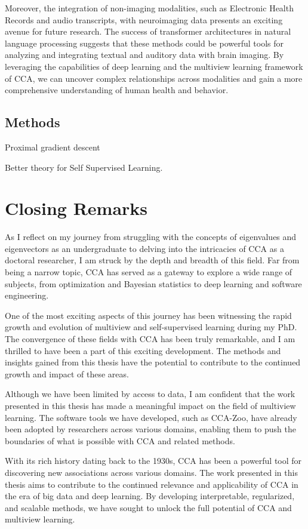Moreover, the integration of non-imaging modalities, such as Electronic Health Records and audio transcripts, with neuroimaging data presents an exciting avenue for future research. The success of transformer architectures in natural language processing suggests that these methods could be powerful tools for analyzing and integrating textual and auditory data with brain imaging. By leveraging the capabilities of deep learning and the multiview learning framework of CCA, we can uncover complex relationships across modalities and gain a more comprehensive understanding of human health and behavior.

\subsection{Methods}

Proximal gradient descent

Better theory for Self Supervised Learning.

\section{Closing Remarks}

As I reflect on my journey from struggling with the concepts of eigenvalues and eigenvectors as an undergraduate to delving into the intricacies of CCA as a doctoral researcher, I am struck by the depth and breadth of this field. Far from being a narrow topic, CCA has served as a gateway to explore a wide range of subjects, from optimization and Bayesian statistics to deep learning and software engineering.

One of the most exciting aspects of this journey has been witnessing the rapid growth and evolution of multiview and self-supervised learning during my PhD. The convergence of these fields with CCA has been truly remarkable, and I am thrilled to have been a part of this exciting development. The methods and insights gained from this thesis have the potential to contribute to the continued growth and impact of these areas.

Although we have been limited by access to data, I am confident that the work presented in this thesis has made a meaningful impact on the field of multiview learning. The software tools we have developed, such as CCA-Zoo, have already been adopted by researchers across various domains, enabling them to push the boundaries of what is possible with CCA and related methods.

With its rich history dating back to the 1930s, CCA has been a powerful tool for discovering new associations across various domains. The work presented in this thesis aims to contribute to the continued relevance and applicability of CCA in the era of big data and deep learning. By developing interpretable, regularized, and scalable methods, we have sought to unlock the full potential of CCA and multiview learning.

